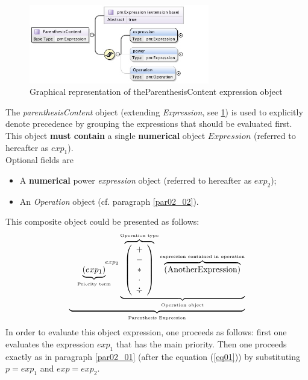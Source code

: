 \documentclass[a4paper,11pt] {ivoa}
\begin{document}
\begin{figure}[htbp]
\begin{center}
\includegraphics[width=0.7\textwidth]{pictures/ParenthesisContent.jpg} 
\caption{Graphical representation of theParenthesisContent expression object}
\label{Pic-ParenthesisContent}
\end{center}
\end{figure}

The {\it parenthesisContent} object (extending {\it Expression}, see
\ref{Pic-ParenthesisContent}) is used to explicitly denote precedence by grouping the
expressions that should be evaluated first. This object {\bf must contain} a single {\bf numerical}
object $Expression$ (referred to hereafter as $exp_1$).\\
Optional fields are 
\begin{itemize}
\item A {\bf numerical} power {\it expression} object (referred to hereafter as $exp_2$);
\item An {\it Operation} object (cf. paragraph \ref{par02_02}).\\
\end{itemize}
This composite object could be presented as follows:
\begin{equation}
 \underbrace{    \underbrace{ \left( exp_1\right) }_{\mbox{\tiny Priority term}} ^{\hspace{15mm}exp_2} \underbrace{  \overbrace{\left( \begin{array}{c} + \\ - \\ \ast  \\ \cdot \\ \div   \end{array} \right) }^{\mbox{\tiny Operation type}}
 \overbrace{    \left( \mbox{AnotherExpression}\right) }^{\mbox{\tiny expression contained in operation}}   }_{\mbox{\tiny Operation object}}}_{\mbox{\tiny Parenthesis Expression}}
\end{equation}
In order to evaluate this object expression, one proceeds as follows: first one evaluates the
expression $exp_1$ that has the main priority. Then one proceeds exactly as in paragraph
\ref{par02_01} (after the equation (\ref{eq01})) by substituting $p=exp_1$ and $exp=exp_2$.
\end{document}
